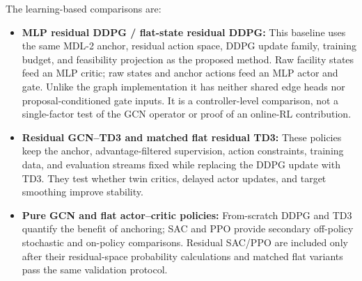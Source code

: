 \documentclass[preprint,review,12pt]{elsarticle}
\begin{document}
The learning-based comparisons are:
\begin{itemize}
\item \textbf{MLP residual DDPG / flat-state residual DDPG:} This baseline uses the same MDL-2 anchor, residual action space, DDPG update family, training budget, and feasibility projection as the proposed method. Raw facility states feed an MLP critic; raw states and anchor actions feed an MLP actor and gate. Unlike the graph implementation it has neither shared edge heads nor proposal-conditioned gate inputs. It is a controller-level comparison, not a single-factor test of the GCN operator or proof of an online-RL contribution.
\item \textbf{Residual GCN--TD3 and matched flat residual TD3:} These policies keep the anchor, advantage-filtered supervision, action constraints, training data, and evaluation streams fixed while replacing the DDPG update with TD3. They test whether twin critics, delayed actor updates, and target smoothing improve stability.
\item \textbf{Pure GCN and flat actor--critic policies:} From-scratch DDPG and TD3 quantify the benefit of anchoring; SAC and PPO provide secondary off-policy stochastic and on-policy comparisons. Residual SAC/PPO are included only after their residual-space probability calculations and matched flat variants pass the same validation protocol.
\end{itemize}
\end{document}
